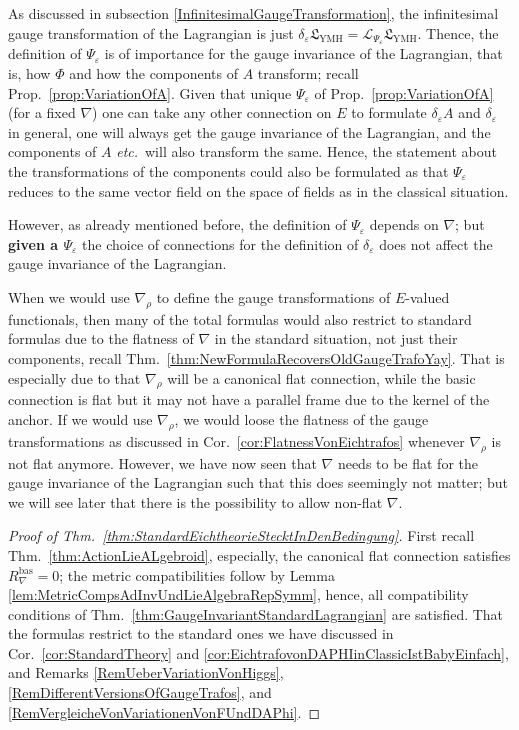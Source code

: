 \begin{remark}
\leavevmode\newline
As discussed in subsection \ref{InfinitesimalGaugeTransformation}, the infinitesimal gauge transformation of the Lagrangian is just $\delta_\varepsilon \mathfrak{L}_{\mathrm{YMH}} = \mathcal{L}_{\Psi_\varepsilon} \mathfrak{L}_{\mathrm{YMH}}$. Thence, the definition of $\Psi_\varepsilon$ is of importance for the gauge invariance of the Lagrangian, that is, how $\Phi$ and how the components of $A$ transform; recall Prop.~\ref{prop:VariationOfA}. Given that unique $\Psi_\varepsilon$ of Prop.~\ref{prop:VariationOfA} (for a fixed $\nabla$) one can take any other connection on $E$ to formulate $\delta_\varepsilon A$ and $\delta_\varepsilon$ in general, one will always get the gauge invariance of the Lagrangian, and the components of $A$ \textit{etc.}~will also transform the same. Hence, the statement about the transformations of the components could also be formulated as that $\Psi_\varepsilon$ reduces to the same vector field on the space of fields as in the classical situation.

However, as already mentioned before, the definition of $\Psi_\varepsilon$ depends on $\nabla$; but \textbf{given a $\Psi_\varepsilon$} the choice of connections for the definition of $\delta_\varepsilon$ does not affect the gauge invariance of the Lagrangian.

When we would use $\nabla_\rho$ to define the gauge transformations of $E$-valued functionals, then many of the total formulas would also restrict to standard formulas due to the flatness of $\nabla$ in the standard situation, not just their components, recall Thm.~\ref{thm:NewFormulaRecoversOldGaugeTrafoYay}. That is especially due to that $\nabla_\rho$ will be a canonical flat connection, while the basic connection is flat but it may not have a parallel frame due to the kernel of the anchor. If we would use $\nabla_\rho$, we would loose the flatness of the gauge transformations as discussed in Cor.~\ref{cor:FlatnessVonEichtrafos} whenever $\nabla_\rho$ is not flat anymore. However, we have now seen that $\nabla$ needs to be flat for the gauge invariance of the Lagrangian such that this does seemingly not matter; but we will see later that there is the possibility to allow non-flat $\nabla$.
\end{remark}

\begin{proof}[Proof of Thm.~\ref{thm:StandardEichtheorieStecktInDenBedingung}]
\leavevmode\newline
First recall Thm.~\ref{thm:ActionLieALgebroid}, especially, the canonical flat connection satisfies $R_\nabla^{\mathrm{bas}}=0$; the metric compatibilities follow by Lemma \ref{lem:MetricCompsAdInvUndLieAlgebraRepSymm}, hence, all compatibility conditions of Thm.~\ref{thm:GaugeInvariantStandardLagrangian} are satisfied. That the formulas restrict to the standard ones we have discussed in Cor.~\ref{cor:StandardTheory} and \ref{cor:EichtrafovonDAPHIinClassicIstBabyEinfach}, and Remarks \ref{RemUeberVariationVonHiggs}, \ref{RemDifferentVersionsOfGaugeTrafos}, and \ref{RemVergleicheVonVariationenVonFUndDAPhi}.
\end{proof}

